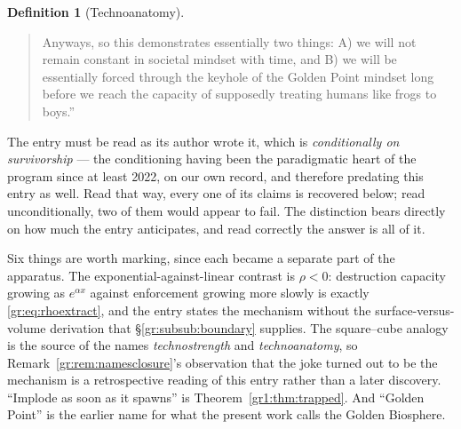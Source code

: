 \documentclass[11pt]{article}
\numberwithin{equation}{section}
\theoremstyle{plain}
\theoremstyle{definition}
\newtheorem{definition}[theorem]{Definition}
\theoremstyle{remark}
\begin{document}
\begin{definition}[Technoanatomy]
{\begin{quote}
Anyways, so this demonstrates essentially two things: A) we will not
remain constant in societal mindset with time, and B) we will be
essentially forced through the keyhole of the Golden Point mindset long
before we reach the capacity of supposedly treating humans like frogs to
boys.''
\end{quote}
The entry must be read as its author wrote it, which is
\emph{conditionally on survivorship} --- the conditioning having been the
paradigmatic heart of the program since at least 2022, on our own
record, and therefore predating this entry as well. Read that way, every
one of its claims is recovered below; read unconditionally, two of them
would appear to fail. The distinction bears directly on how much the
entry anticipates, and read correctly the answer is all of it.

Six things are worth marking, since each became a separate part of the
apparatus. The exponential-against-linear contrast is
$\rho<0$: destruction capacity growing as $e^{\alpha x}$ against
enforcement growing more slowly is exactly
\eqref{gr:eq:rhoextract}, and the entry states the mechanism without the
surface-versus-volume derivation that \S\ref{gr:subsub:boundary}
supplies. The square--cube analogy is the source of the names
\emph{technostrength} and \emph{technoanatomy}, so
Remark~\ref{gr:rem:namesclosure}'s observation that the joke turned out
to be the mechanism is a retrospective reading of this entry rather than
a later discovery. ``Implode as soon as it spawns'' is
Theorem~\ref{gr1:thm:trapped}. And ``Golden Point'' is the earlier name
for what the present work calls the Golden Biosphere.

}
\end{definition}
\end{document}
